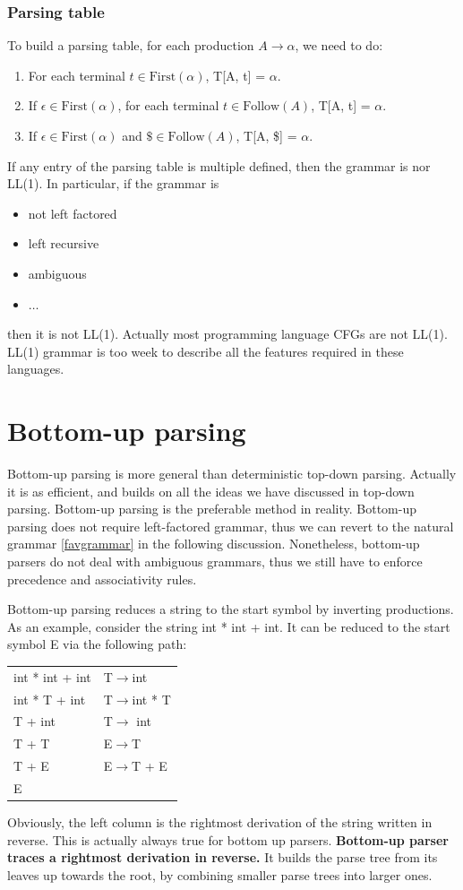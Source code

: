 \subsubsection{Parsing table}
To build a parsing table, for each production $A\rightarrow \alpha$, we need to do:
\begin{enumerate}
\item For each terminal $t\in\text{First}(\alpha)$, T[A, t] = $\alpha$.
\item If $\epsilon\in\text{First}(\alpha)$, for each terminal $t\in\text{Follow}(A)$, T[A, t] = $\alpha$.
\item If $\epsilon\in\text{First}(\alpha)$ and $\$\in\text{Follow}(A)$, T[A, \$] = $\alpha$.
\end{enumerate}

If any entry of the parsing table is multiple defined, then the grammar is nor LL(1). In particular, if the grammar is 
\begin{itemize}
\item not left factored
\item left recursive
\item ambiguous
\item $\dots$
\end{itemize}
then it is not LL(1). Actually most programming language CFGs are not LL(1). LL(1) grammar is too week to describe all the features required in these languages. 
\section{Bottom-up parsing}
Bottom-up parsing is more general than deterministic top-down parsing. Actually it is as efficient, and builds on all the ideas we have discussed in top-down parsing. Bottom-up parsing is the preferable method in reality. Bottom-up parsing does not require left-factored grammar, thus we can revert to the natural grammar \eqref{favgrammar} in the following discussion. Nonetheless, bottom-up parsers do not deal with ambiguous grammars, thus we still have to enforce precedence and associativity rules.

Bottom-up parsing reduces a string to the start symbol by inverting productions. As an example, consider the string int * int + int. It can be reduced to the start symbol E via the following path:
\begin{table}[H]
\centering
\begin{tabular}{ll}
int * int + int & T$\rightarrow$int\\
int * T + int & T$\rightarrow$int * T\\
T + int & T$\rightarrow$ int\\
T + T & E$\rightarrow$T\\
T + E & E$\rightarrow$T + E\\
E&\\
\end{tabular}
\end{table}
Obviously, the left column is the rightmost derivation of the string written in reverse. This is actually always true for bottom up parsers. {\bf Bottom-up parser traces a rightmost derivation in reverse.} It builds the parse tree from its leaves up towards the root, by combining smaller parse trees into larger ones.
